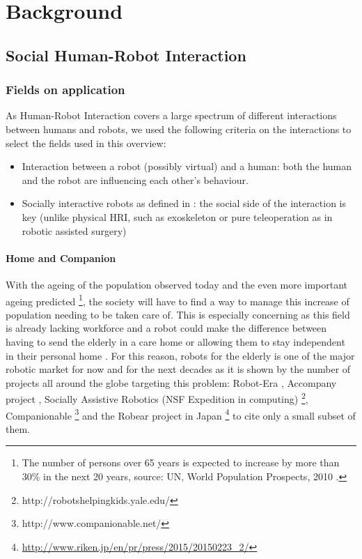 \chapter{Background} \label{chap:background}

\section{Social Human-Robot Interaction}

\subsection{Fields on application}

As Human-Robot Interaction covers a large spectrum of different interactions between humans and robots, we used the following criteria on the interactions to select the fields used in this overview:
\begin{itemize}
\item Interaction between a robot (possibly virtual) and a human: both the human and the robot are influencing each other's behaviour.
\item Socially interactive robots as defined in \citep{Fong2003}: the social
    side of the interaction is key (unlike physical HRI, such as exoskeleton or
    pure teleoperation as in robotic assisted surgery)
\end{itemize}

\subsubsection{Home and Companion}

    With the ageing of the population observed today and the even more important
    ageing predicted \footnote{The number of persons over 65 years is expected
    to increase by more than 30\% in the next 20 years, source: UN, World
    Population Prospects, 2010 \citep{rodrigues2012facts}.}, the society will
    have to find a way to manage this increase of population needing to be taken
    care of. This is especially concerning as this field is already lacking
    workforce and a robot could make the difference between having to send the
    elderly in a care home or allowing them to stay independent in their
    personal home \citep{di2014web}. For this reason, robots for the elderly is
    one of the major robotic market for now and for the next decades as it is
    shown by the number of projects all around the globe targeting this problem:
    Robot-Era \citep{bevilacqua2012robot}, Accompany project
    \citep{amirabdollahian2013accompany}, Socially Assistive Robotics (NSF
    Expedition in computing) \footnote{http://robotshelpingkids.yale.edu/},
    Companionable \footnote{http://www.companionable.net/} and the Robear
    project in Japan
    \footnote{\url{http://www.riken.jp/en/pr/press/2015/20150223_2/}} to cite
    only a small subset of them.	
	
